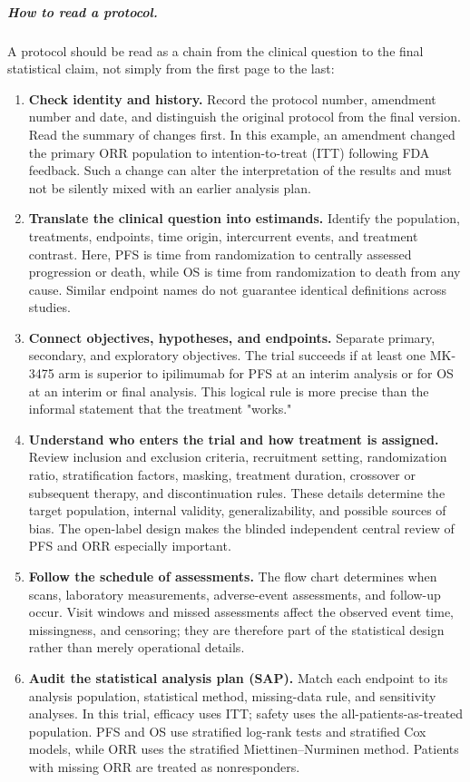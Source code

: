 \documentclass[12pt,oneside]{book}
\numberwithin{equation}{section}
\theoremstyle{definition}
\theoremstyle{plain}
\theoremstyle{remark}
\begin{document}
\subparagraph{How to read a protocol.}
A protocol should be read as a chain from the clinical question to the final statistical claim, not simply from the first page to the last:
\begin{enumerate}
    \item \textbf{Check identity and history.} Record the protocol number, amendment number and date, and distinguish the original protocol from the final version. Read the summary of changes first. In this example, an amendment changed the primary ORR population to intention-to-treat (ITT) following FDA feedback. Such a change can alter the interpretation of the results and must not be silently mixed with an earlier analysis plan.
    \item \textbf{Translate the clinical question into estimands.} Identify the population, treatments, endpoints, time origin, intercurrent events, and treatment contrast. Here, PFS is time from randomization to centrally assessed progression or death, while OS is time from randomization to death from any cause. Similar endpoint names do not guarantee identical definitions across studies.
    \item \textbf{Connect objectives, hypotheses, and endpoints.} Separate primary, secondary, and exploratory objectives. The trial succeeds if at least one MK-3475 arm is superior to ipilimumab for PFS at an interim analysis or for OS at an interim or final analysis. This logical rule is more precise than the informal statement that the treatment "works."
    \item \textbf{Understand who enters the trial and how treatment is assigned.} Review inclusion and exclusion criteria, recruitment setting, randomization ratio, stratification factors, masking, treatment duration, crossover or subsequent therapy, and discontinuation rules. These details determine the target population, internal validity, generalizability, and possible sources of bias. The open-label design makes the blinded independent central review of PFS and ORR especially important.
    \item \textbf{Follow the schedule of assessments.} The flow chart determines when scans, laboratory measurements, adverse-event assessments, and follow-up occur. Visit windows and missed assessments affect the observed event time, missingness, and censoring; they are therefore part of the statistical design rather than merely operational details.
    \item \textbf{Audit the statistical analysis plan (SAP).} Match each endpoint to its analysis population, statistical method, missing-data rule, and sensitivity analyses. In this trial, efficacy uses ITT; safety uses the all-patients-as-treated population. PFS and OS use stratified log-rank tests and stratified Cox models, while ORR uses the stratified Miettinen--Nurminen method. Patients with missing ORR are treated as nonresponders.

\end{enumerate}
\end{document}
